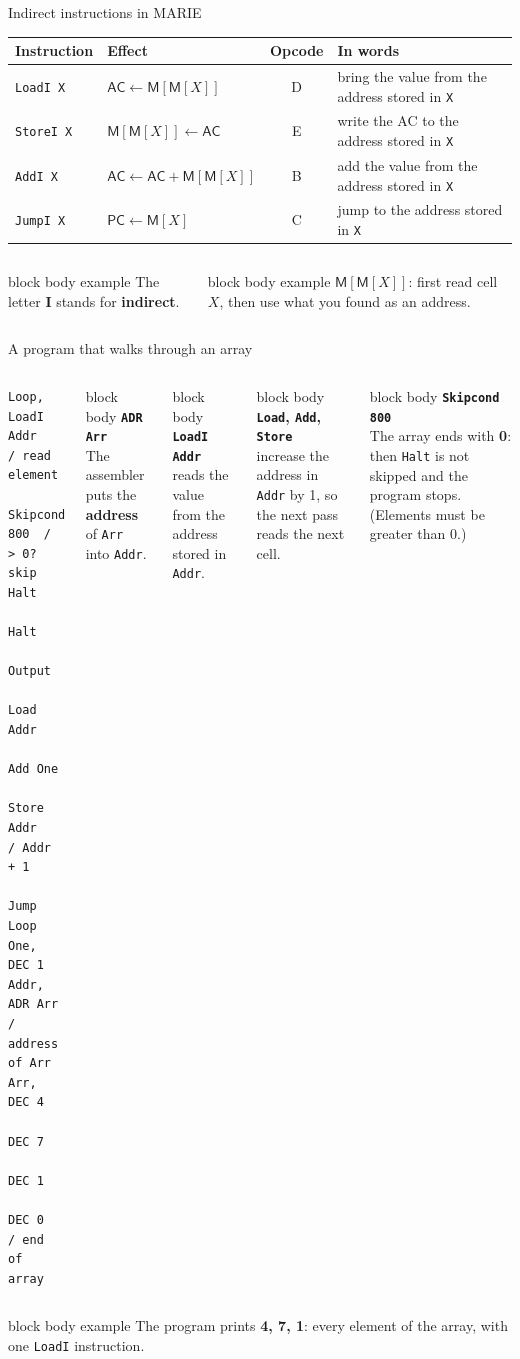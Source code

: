 \documentclass[aspectratio=169,10pt]{beamer}
\newcommand{\defbox}[1]{%
  \begin{beamercolorbox}[rounded=true,sep=0.1cm,wd=\linewidth]{block body example}
    \footnotesize #1
  \end{beamercolorbox}\vspace{0.06cm}}
\newcommand{\stepbox}[2]{%
  \begin{beamercolorbox}[rounded=true,sep=0.09cm,wd=\linewidth]{block body}
    \footnotesize\textbf{#1}\\ #2
  \end{beamercolorbox}\vspace{0.06cm}}
\newcommand{\keymsg}[1]{%
  \begin{beamercolorbox}[rounded=true,sep=0.1cm,wd=\textwidth]{block body example}
    \centering\footnotesize #1
  \end{beamercolorbox}}
\begin{document}
\begin{frame}{Indirect instructions in MARIE}
  \begin{center}
    \scriptsize
    \renewcommand{\arraystretch}{1.25}
    \begin{tabular}{llcl}
      \toprule
      \textbf{Instruction} & \textbf{Effect} & \textbf{Opcode} & \textbf{In words} \\
      \midrule
      \texttt{LoadI X}  & $\mathsf{AC}\leftarrow\mathsf{M}[\mathsf{M}[X]]$ & D & bring the value from the address stored in \texttt{X} \\
      \texttt{StoreI X} & $\mathsf{M}[\mathsf{M}[X]]\leftarrow\mathsf{AC}$ & E & write the AC to the address stored in \texttt{X} \\
      \texttt{AddI X}   & $\mathsf{AC}\leftarrow\mathsf{AC}+\mathsf{M}[\mathsf{M}[X]]$ & B & add the value from the address stored in \texttt{X} \\
      \texttt{JumpI X}  & $\mathsf{PC}\leftarrow\mathsf{M}[X]$ & C & jump to the address stored in \texttt{X} \\
      \bottomrule
    \end{tabular}
  \end{center}
  \vspace{0.3cm}
  \begin{columns}[T,onlytextwidth]
      \defbox{The letter \textbf{I} stands for \textbf{indirect}.}
      \defbox{$\mathsf{M}[\mathsf{M}[X]]$: first read cell $X$, then use what you found as an address.}
  \end{columns}
\end{frame}

\begin{frame}[fragile]{A program that walks through an array}
  \begin{columns}[T,onlytextwidth]
\begin{lstlisting}[style=marie]
Loop,  LoadI Addr    / read element
       Skipcond 800  / > 0? skip Halt
       Halt
       Output
       Load Addr
       Add One
       Store Addr    / Addr + 1
       Jump Loop
One,   DEC 1
Addr,  ADR Arr       / address of Arr
Arr,   DEC 4
       DEC 7
       DEC 1
       DEC 0         / end of array
\end{lstlisting}
      \stepbox{\texttt{ADR Arr}}{The assembler puts the \textbf{address} of \texttt{Arr} into \texttt{Addr}.}
      \stepbox{\texttt{LoadI Addr}}{reads the value from the address stored in \texttt{Addr}.}
      \stepbox{\texttt{Load}, \texttt{Add}, \texttt{Store}}{increase the address in \texttt{Addr} by 1,
        so the next pass reads the next cell.}
      \stepbox{\texttt{Skipcond 800}}{The array ends with \textbf{0}: then \texttt{Halt} is not skipped
        and the program stops. (Elements must be greater than 0.)}
  \end{columns}
  \vfill
  \keymsg{The program prints \textbf{4, 7, 1}: every element of the array, with one \texttt{LoadI} instruction.}
\end{frame}
\end{document}
